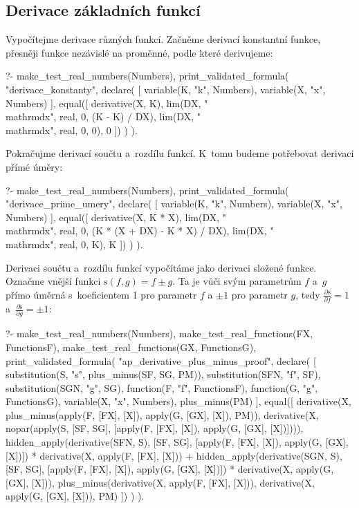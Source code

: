 \subsection{Derivace základních funkcí}
\label{sec:derivace_zakladnich_funkci}

Vypočítejme derivace různých funkcí. Začněme derivací konstantní funkce, přesněji funkce nezávislé na proměnné, podle které derivujeme:

\begin{prolog}
?-	make_test_real_numbers(Numbers),
	print_validated_formula(
		"derivace_konstanty",
		declare(	
			[
				variable(K, "k", Numbers),
				variable(X, "x", Numbers)
			],
			equal([
				derivative(X, K),
				lim(DX, "\\mathrm{d}x", real, 0, (K - K) / DX),
				lim(DX, "\\mathrm{d}x", real, 0, 0),
				0
			])
		)
	).
\end{prolog}

Pokračujme derivací součtu a~rozdílu funkcí. K~tomu budeme potřebovat derivaci přímé úměry:

\begin{prolog}
?-	make_test_real_numbers(Numbers),
	print_validated_formula(
		"derivace_prime_umery",
		declare(	
			[
				variable(K, "k", Numbers),
				variable(X, "x", Numbers)
			],
			equal([
				derivative(X, K * X),
				lim(DX, "\\mathrm{d}x", real, 0, (K * (X + DX) - K * X) / DX),
				lim(DX, "\\mathrm{d}x", real, 0, K),
				K
			])
		)
	).
\end{prolog}

Derivaci součtu a~rozdílu funkcí vypočítáme jako derivaci složené funkce. Označme vnější funkci \(\mathrm{s}(f, g) = f \pm g\). Ta je vůči svým parametrům \(f\) a~\(g\) přímo úměrná s~koeficientem 1 pro parametr \(f\) a \(\pm1\) pro parametr \(g\), tedy \(\frac{\partial \mathrm{s}}{\partial f} = 1\) a~\(\frac{\partial \mathrm{s}}{\partial g} = \pm1\):

\begin{prolog}
?-	make_test_real_numbers(Numbers),
	make_test_real_functions(FX, FunctionsF),
	make_test_real_functions(GX, FunctionsG),
	print_validated_formula(
		"ap_derivative_plus_minus_proof",
		declare(
			[
				substitution(S, "s", plus_minus(SF, SG, PM)),
				substitution(SFN, "f", SF),
				substitution(SGN, "g", SG),
				function(F, "f", FunctionsF),
				function(G, "g", FunctionsG),
				variable(X, "x", Numbers),
				plus_minus(PM)
			],
			equal([
				derivative(X, plus_minus(apply(F, [FX], [X]), apply(G, [GX], [X]), PM)),
				derivative(X, nopar(apply(S, [SF, SG], [apply(F, [FX], [X]), apply(G, [GX], [X])]))),
				hidden_apply(derivative(SFN, S), [SF, SG], [apply(F, [FX], [X]), apply(G, [GX], [X])]) * derivative(X, apply(F, [FX], [X])) +
				hidden_apply(derivative(SGN, S), [SF, SG], [apply(F, [FX], [X]), apply(G, [GX], [X])]) * derivative(X, apply(G, [GX], [X])),
				plus_minus(derivative(X, apply(F, [FX], [X])), derivative(X, apply(G, [GX], [X])), PM)
			])
		)
	).
\end{prolog}

